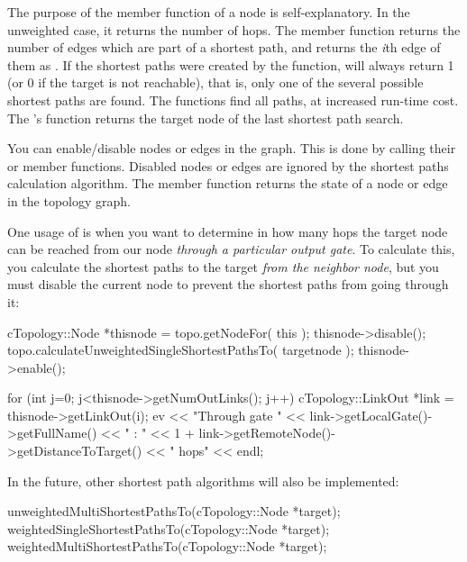 The purpose of the  member function of a
node is self-explanatory. In the unweighted case, it returns the
number of hops. The  member function returns the number
of edges which are part of a shortest path, and
 returns the \textit{i}th edge of them as
. If the shortest paths were created by the
 function,
 will always return 1 (or 0 if the target is not
reachable), that is, only one of the several possible shortest paths
are found.  The
 functions
find all paths, at increased run-time cost. The 's
 function returns the target node of the last
shortest path search.

You can enable/disable nodes or edges in the graph. This is done by
calling their  or  member functions.
Disabled nodes or edges are ignored by the shortest paths calculation
algorithm. The  member function returns the state of
a node or edge in the topology graph.

One usage of  is when you want to determine in how many
hops the target node can be reached from our node \textit{through
a particular output gate}. To calculate this, you calculate the
shortest paths to the target \textit{from the neighbor node}, but
you must disable the current node to prevent the shortest paths
from going through it:

\begin{cpp}
cTopology::Node *thisnode = topo.getNodeFor( this );
thisnode->disable();
topo.calculateUnweightedSingleShortestPathsTo( targetnode );
thisnode->enable();

for (int j=0; j<thisnode->getNumOutLinks(); j++)
{
  cTopology::LinkOut *link = thisnode->getLinkOut(i);
  ev << "Through gate " << link->getLocalGate()->getFullName() << " : "
     << 1 + link->getRemoteNode()->getDistanceToTarget() << " hops" << endl;
}
\end{cpp}

In the future, other shortest path algorithms will also be implemented:

\begin{cpp}
unweightedMultiShortestPathsTo(cTopology::Node *target);
weightedSingleShortestPathsTo(cTopology::Node *target);
weightedMultiShortestPathsTo(cTopology::Node *target);
\end{cpp}






